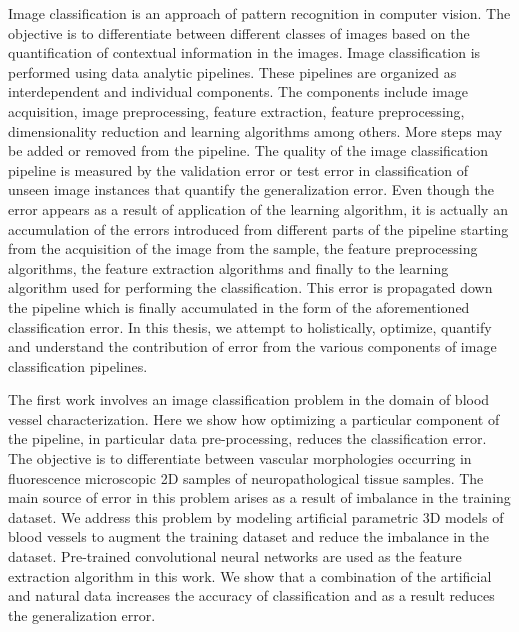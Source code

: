 
Image classification is an approach of pattern recognition in computer vision. The objective is to differentiate between different classes of images based on the quantification of contextual information in the images. Image classification is performed using data analytic pipelines. These pipelines are organized as interdependent and individual components. The components include image acquisition, image preprocessing, feature extraction, feature preprocessing, dimensionality reduction and learning algorithms among others. More steps may be added or removed from the pipeline. The quality of the image classification pipeline is measured by the validation error or test error in classification of unseen image instances that quantify the generalization error. Even though the error appears as a result of application of the learning algorithm, it is actually an accumulation of the errors introduced from different parts of the pipeline starting from the acquisition of the image from the sample, the feature preprocessing algorithms, the feature extraction algorithms and finally to the learning algorithm used for performing the  classification. This error is propagated down the pipeline which is finally accumulated in the form of the aforementioned classification error. In this thesis, we attempt to holistically, optimize, quantify and understand the contribution of error from the various components of image classification pipelines.   


The first work involves an image classification problem in the domain of blood vessel characterization. Here we show how optimizing a particular component of the pipeline, in particular data pre-processing, reduces the classification error. The objective is to differentiate between vascular morphologies occurring in fluorescence microscopic 2D samples of neuropathological tissue samples. The main source of error in this problem arises as a result of imbalance in the training dataset. We address this problem by modeling artificial parametric 3D models of blood vessels to augment the training dataset and reduce the imbalance in the dataset. Pre-trained convolutional neural networks are used as the feature extraction algorithm in this work. We show that a combination of the artificial and natural data increases the accuracy of classification and as a result reduces the generalization error.

